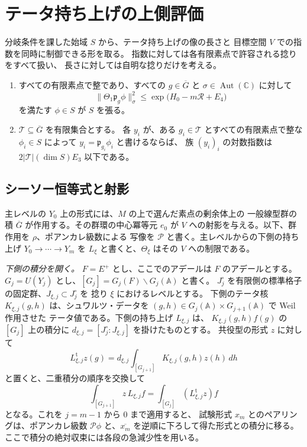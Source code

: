 \section{テータ持ち上げの上側評価}\label{sec:upper-bound}

分岐条件を課した始域 \(S\) から、テータ持ち上げの像の長さと
目標空間 \(V\) での指数を同時に制御できる形を取る。
指数に対しては各有限素点で許容される捻りをすべて扱い、
長さに対しては自明な捻りだけを考える。

\begin{theorem}[上側評価]\label{thm:upper-bound}
\begin{enumerate}
\item すべての有限素点で整であり、すべての \(g\in\overline G\) と
\(\sigma\in\operatorname{Aut}(\mathbb C)\) に対して
\[
  \|\Theta_1\mathfrak p_g\phi\|_\sigma^2
  \le \exp\!\bigl(H_0-m\mathcal R+E_4\bigr)
\]
を満たす \(\phi\in S\) が \(S\) を張る。
\item \(\mathcal T\subseteq\overline G\) を有限集合とする。
各 \(y_i\) が、ある \(g_i\in\mathcal T\) とすべての有限素点で整な
\(\phi_i\in S\) によって \(y_i=\mathfrak p_{g_i}\phi_i\) と書けるならば、
族 \((y_i)_i\) の対数指数は \(2|\mathcal T|(\dim S)E_3\) 以下である。
\end{enumerate}
\end{theorem}

\subsection{シーソー恒等式と射影}

主レベルの \(Y_0\) 上の形式には、\(M\) の上で選んだ素点の剰余体上の
一般線型群の積 \(\overline G\) が作用する。その群環の中心冪等元 \(e_0\)
が \(V\) への射影を与える。以下、群作用を \(\rho\)、ポアンカレ級数による
写像を \(\mathcal P\) と書く。主レベルからの下側の持ち上げ
\(Y_0\to\cdots\to Y_m\) を \(L_\xi\) と書くと、\(\Theta_\xi\) はその
\(V\) への制限である。

\emph{下側の積分を開く。}
\(F=E^+\) とし、ここでのアデールは \(F\) のアデールとする。
\(G_j=U(Y_j)\) とし、\([G_j]=G_j(F)\backslash G_j(\mathbb A)\) と書く。
\(J^\circ_j\) を有限側の標準格子の固定群、\(J_{\xi,j}\subset J^\circ_j\) を
捻り \(\xi\) におけるレベルとする。
下側のテータ核 \(K_{\xi,j}(g,h)\) は、シュワルツ・データを
\((g,h)\in G_j(\mathbb A)\times G_{j+1}(\mathbb A)\) で Weil 作用させた
テータ値である。下側の持ち上げ \(L_{\xi,j}\) は、
\(K_{\xi,j}(g,h)f(g)\) の \([G_j]\) 上の積分に
\(d_{\xi,j}=[J^\circ_j:J_{\xi,j}]\) を掛けたものとする。
共役型の形式 \(z\) に対して
\[
 L_{\xi,j}^{\mathrm t}z(g)=d_{\xi,j}
          \int_{[G_{j+1}]}K_{\xi,j}(g,h)z(h)\,dh
\]
と置くと、二重積分の順序を交換して
\[
  \int_{[G_{j+1}]} z\,L_{\xi,j} f
      = \int_{[G_j]}(L_{\xi,j}^{\mathrm t}z)f
\]
となる。これを \(j=m-1\) から \(0\) まで適用すると、
試験形式 \(x_m\) とのペアリングは、ポアンカレ級数
\(\mathcal P\phi\) と、\(\overline{x_m}\) を逆順に下ろして得た形式との積分に移る。
ここで積分の絶対収束には各段の急減少性を用いる。

